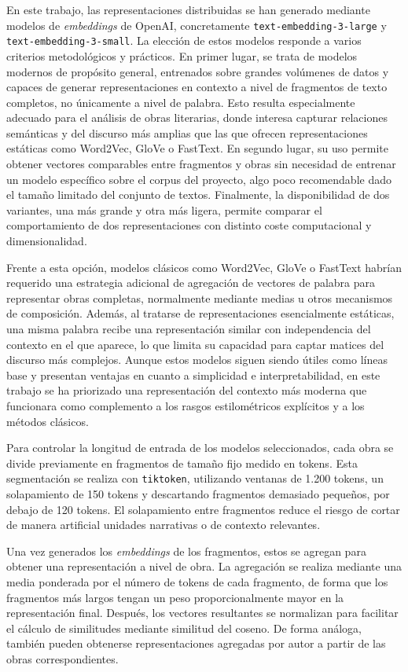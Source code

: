 \documentclass[IB]{TFUOC}%
\begin{document}
En este trabajo, las representaciones distribuidas se han generado mediante modelos de \textit{embeddings} de OpenAI, concretamente \texttt{text-embedding-3-large} y \texttt{text-embedding-3-small}\cite{OpenAIEmbeddingsGuide}. La elección de estos modelos responde a varios criterios metodológicos y prácticos. En primer lugar, se trata de modelos modernos de propósito general, entrenados sobre grandes volúmenes de datos y capaces de generar representaciones en contexto a nivel de fragmentos de texto completos, no únicamente a nivel de palabra. Esto resulta especialmente adecuado para el análisis de obras literarias, donde interesa capturar relaciones semánticas y del discurso más amplias que las que ofrecen representaciones estáticas como Word2Vec, GloVe o FastText. En segundo lugar, su uso permite obtener vectores comparables entre fragmentos y obras sin necesidad de entrenar un modelo específico sobre el corpus del proyecto, algo poco recomendable dado el tamaño limitado del conjunto de textos. Finalmente, la disponibilidad de dos variantes, una más grande y otra más ligera, permite comparar el comportamiento de dos representaciones con distinto coste computacional y dimensionalidad.

Frente a esta opción, modelos clásicos como Word2Vec, GloVe o FastText habrían requerido una estrategia adicional de agregación de vectores de palabra para representar obras completas, normalmente mediante medias u otros mecanismos de composición. Además, al tratarse de representaciones esencialmente estáticas, una misma palabra recibe una representación similar con independencia del contexto en el que aparece, lo que limita su capacidad para captar matices del discurso más complejos. Aunque estos modelos siguen siendo útiles como líneas base y presentan ventajas en cuanto a simplicidad e interpretabilidad, en este trabajo se ha priorizado una representación del contexto más moderna que funcionara como complemento a los rasgos estilométricos explícitos y a los métodos clásicos.

Para controlar la longitud de entrada de los modelos seleccionados, cada obra se divide previamente en fragmentos de tamaño fijo medido en tokens. Esta segmentación se realiza con \texttt{tiktoken}, utilizando ventanas de 1.200 tokens, un solapamiento de 150 tokens y descartando fragmentos demasiado pequeños, por debajo de 120 tokens. El solapamiento entre fragmentos reduce el riesgo de cortar de manera artificial unidades narrativas o de contexto relevantes.

Una vez generados los \textit{embeddings} de los fragmentos, estos se agregan para obtener una representación a nivel de obra. La agregación se realiza mediante una media ponderada por el número de tokens de cada fragmento, de forma que los fragmentos más largos tengan un peso proporcionalmente mayor en la representación final. Después, los vectores resultantes se normalizan para facilitar el cálculo de similitudes mediante similitud del coseno. De forma análoga, también pueden obtenerse representaciones agregadas por autor a partir de las obras correspondientes.
\end{document}

